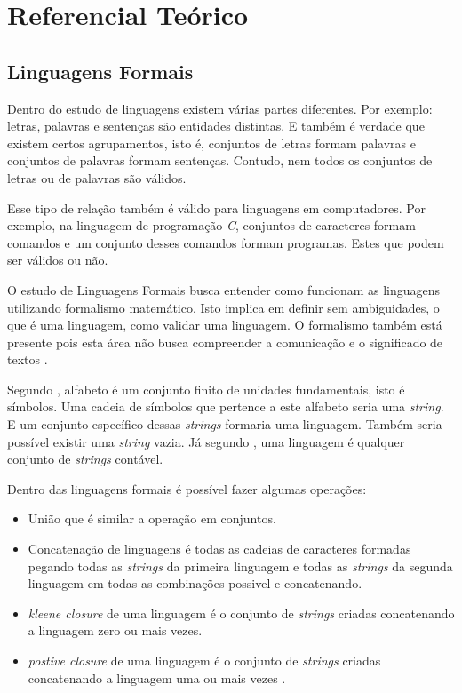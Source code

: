 \chapter[Referencial Teórico]{Referencial Teórico}

\section{Linguagens Formais}
\label{sec:languages}

Dentro do estudo de linguagens existem várias partes diferentes.
Por exemplo: letras, palavras e sentenças são entidades distintas. E 
também é verdade que existem certos agrupamentos, isto é,  conjuntos de letras
formam palavras e  conjuntos de palavras formam sentenças. Contudo, nem todos os conjuntos
de letras ou de palavras são válidos. 

Esse tipo de relação também é válido para linguagens em computadores. 
Por exemplo, na linguagem de programação \textit{C}, conjuntos de caracteres formam comandos 
e um conjunto desses comandos formam programas. Estes que podem ser válidos ou não.

O estudo de Linguagens Formais busca entender como funcionam as linguagens utilizando
formalismo matemático. Isto implica em definir sem ambiguidades, o que é uma linguagem, 
como validar uma linguagem. O formalismo também está presente pois esta área não busca
compreender a comunicação e o significado de textos \cite{cohen1986}.

Segundo , alfabeto é um conjunto finito de unidades fundamentais, isto é símbolos.
Uma cadeia de símbolos que pertence a este alfabeto seria uma \textit{string}. E um conjunto específico
dessas \textit{strings} formaria uma linguagem. Também seria possível existir uma \textit{string} vazia.
Já segundo , uma linguagem é qualquer conjunto de \textit{strings} contável.

Dentro das linguagens formais é possível fazer algumas operações: 

\begin{itemize} 
    \item União que é similar a operação em conjuntos.
    \item Concatenação de linguagens é todas as cadeias de caracteres formadas pegando todas as \textit{strings} da primeira
    linguagem e todas as \textit{strings} da segunda linguagem em todas as combinações possivel e concatenando.
    \item \textit{kleene closure} de uma linguagem é o conjunto de \textit{strings} criadas concatenando a linguagem zero 
    ou mais vezes.
    \item \textit{postive closure} de uma linguagem é o conjunto de \textit{strings} criadas concatenando a linguagem uma 
    ou mais vezes \cite{aho2006}.
\end{itemize}

